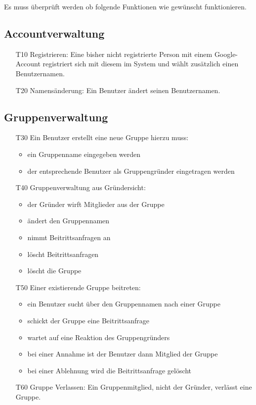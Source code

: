 \documentclass{scrartcl}
\begin{document}
	Es muss überprüft werden ob folgende Funktionen wie gewünscht funktionieren.
	
	\subsection{Accountverwaltung}
	\begin{itemize} 
		\item[T10] Registrieren: Eine bisher nicht registrierte Person mit einem Google-Account registriert sich mit diesem im System und wählt zusätzlich einen Benutzernamen.
		\item[T20] Namensänderung: Ein Benutzer ändert seinen Benutzernamen.
	\end{itemize}	
	
	\subsection{Gruppenverwaltung}
	\begin{itemize}
		\item[T30] Ein Benutzer erstellt eine neue Gruppe hierzu muss:
			\begin{itemize}
			\item ein Gruppenname eingegeben werden
			\item der entsprechende Benutzer als Gruppengründer eingetragen werden
			\end{itemize}
		\item[T40] Gruppenverwaltung aus Gründersicht:
			\begin{itemize}
			\item der Gründer wirft Mitglieder aus der Gruppe
			\item ändert den Gruppennamen
			\item nimmt Beitrittsanfragen an
			\item löscht Beitrittsanfragen
			\item löscht die Gruppe
			\end{itemize}
		\item[T50] Einer existierende Gruppe beitreten:
	 		\begin{itemize}
			\item ein Benutzer sucht über den Gruppennamen nach einer Gruppe 
			\item schickt der Gruppe eine Beitrittsanfrage
			\item wartet auf eine Reaktion des Gruppengründers
			\item bei einer Annahme ist der Benutzer dann Mitglied der Gruppe
			\item bei einer Ablehnung wird die Beitrittsanfrage gelöscht 
			\end{itemize}
		\item[T60] Gruppe Verlassen: Ein Gruppenmitglied, nicht der Gründer, verlässt eine Gruppe.
	\end{itemize}	
\end{document}
